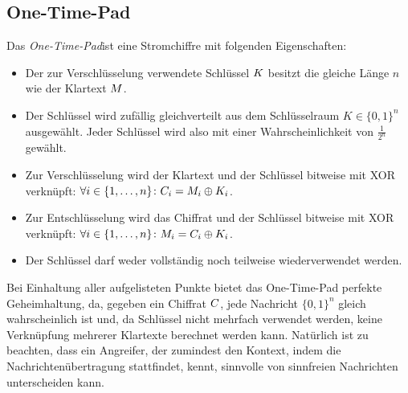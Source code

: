 \subsection{One-Time-Pad}
\label{ssec:otp}
Das \emph{One-Time-Pad}\indexOTP ist eine Stromchiffre mit folgenden Eigenschaften:
\begin{itemize}
\item Der zur Verschlüsselung verwendete Schlüssel $K$ besitzt die
  gleiche Länge $n$ wie der Klartext $M$. 
\item Der Schlüssel wird zufällig gleichverteilt aus dem Schlüsselraum
  $K \in \{0,1\}^{n}$ ausgewählt. Jeder Schlüssel wird also mit einer
  Wahrscheinlichkeit von $\frac{1}{2^{n}}$ gewählt. 
\item Zur Verschlüsselung wird der Klartext und der Schlüssel bitweise
  mit XOR verknüpft: $\forall i \in \{1,\dots,n\}\colon C_i =
  M_i\oplus K_i$. 
\item Zur Entschlüsselung wird das Chiffrat und der Schlüssel bitweise
  mit XOR verknüpft: $\forall i \in \{1,\dots,n\}\colon M_i =
  C_i\oplus K_i$.
\item Der Schlüssel darf weder vollständig noch teilweise
  wiederverwendet werden. 
\end{itemize}
Bei Einhaltung aller aufgelisteten Punkte bietet das One-Time-Pad
perfekte Geheimhaltung, da, gegeben ein Chiffrat $C$, jede
Nachricht $\{0,1\}^{n}$ gleich wahrscheinlich ist und, da Schlüssel
nicht mehrfach verwendet werden, keine Verknüpfung mehrerer Klartexte
berechnet werden kann. Natürlich ist zu beachten, dass ein Angreifer,
der zumindest den Kontext, indem die Nachrichtenübertragung stattfindet,
kennt, sinnvolle von sinnfreien Nachrichten unterscheiden kann.

